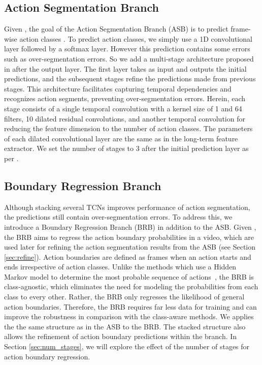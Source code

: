 \documentclass[10pt,twocolumn,letterpaper]{article}
\begin{document}
\subsection{Action Segmentation Branch}
\label{asb}
Given , the goal of the Action Segmentation Branch (ASB) is to predict frame-wise action classes .
To predict action classes, we simply use a 1D convolutional layer followed by a softmax layer.
However this prediction contains some errors such as over-segmentation errors.
So we add a multi-stage architecture proposed in \cite{mstcn} after the output layer.
The first layer takes  as input and outputs the initial predictions,
and the subsequent stages refine the predictions made from previous stages.
This architecture facilitates capturing temporal dependencies and recognizes action segments, 
preventing over-segmentation errors.
Herein, each stage consists of a single temporal convolution with a kernel size of 1 and 64 filters,
10 dilated residual convolutions, and another temporal convolution
for reducing the feature dimension to the number of action classes. 
The parameters of each dilated convolutional layer are the same as in the long-term feature extractor.
We set the number of stages to 3 after the initial prediction layer as per \cite{mstcn}.

\subsection{Boundary Regression Branch}
\label{brb}
Although stacking several TCNs improves performance of action segmentation,
the predictions still contain over-segmentation errors.
To address this, we introduce a Boundary Regression Branch (BRB) in addition to the ASB.
Given , the BRB aims to regress the action boundary probabilities  in a video,
which are used later for refining the action segmentation results from the ASB (see Section \ref{sec:refine}).
Action boundaries are defined as frames when an action starts and ends irrespective of action classes.
Unlike the methods which use a Hidden Markov model to determine the most probable sequence of actions~\cite{markov1,hmm},
the BRB is class-agnostic, which eliminates the need for modeling the probabilities from each class to every other.
Rather, the BRB only regresses the likelihood of general action boundaries.
Therefore, the BRB requires far less data for training and can improve the robustness in comparison with the class-aware methods.
We applies the the same structure as in the ASB to the BRB.
The stacked structure also allows the refinement of action boundary predictions within the branch.
In Section \ref{sec:num_stages}, we will explore the effect of the number of stages for action boundary regression.
\end{document}
